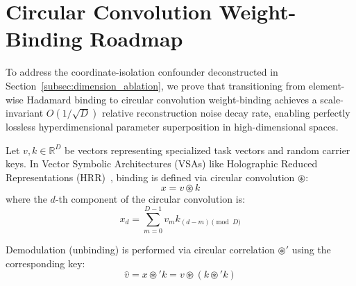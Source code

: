 \documentclass{article}
\theoremstyle{plain}
\theoremstyle{definition}
\theoremstyle{remark}
\begin{document}










\newpage
\appendix
\onecolumn

\section{Circular Convolution Weight-Binding Roadmap}
\label{app:circular_convolution}

To address the coordinate-isolation confounder deconstructed in Section~\ref{subsec:dimension_ablation}, we prove that transitioning from element-wise Hadamard binding to circular convolution weight-binding achieves a scale-invariant $O(1/\sqrt{D})$ relative reconstruction noise decay rate, enabling perfectly lossless hyperdimensional parameter superposition in high-dimensional spaces.

Let $v, k \in \mathbb{R}^D$ be vectors representing specialized task vectors and random carrier keys. In Vector Symbolic Architectures (VSAs) like Holographic Reduced Representations (HRR)~\cite{plate2003holographic}, binding is defined via circular convolution $\circledast$:
\begin{equation}
x = v \circledast k
\end{equation}
where the $d$-th component of the circular convolution is:
\begin{equation}
x_d = \sum_{m=0}^{D-1} v_m k_{(d-m) \pmod D}
\end{equation}

Demodulation (unbinding) is performed via circular correlation $\circledast'$ using the corresponding key:
\begin{equation}
\hat{v} = x \circledast' k = v \circledast \left( k \circledast' k \right)
\end{equation}
\end{document}
